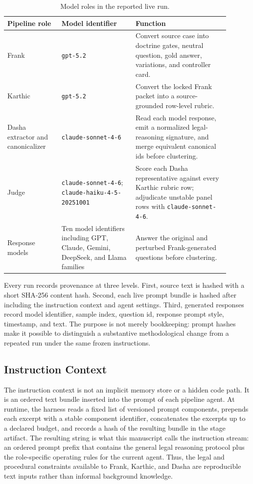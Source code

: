 \begin{table}[h]
\centering
\caption{Model roles in the reported live run.}
\label{tab:model-roles}
\begin{tabular}{p{0.22\linewidth}p{0.30\linewidth}p{0.38\linewidth}}
\toprule
Pipeline role & Model identifier & Function \\
\midrule
Frank & \texttt{gpt-5.2} & Convert source case into doctrine gates, neutral question, gold answer, variations, and controller card. \\
Karthic & \texttt{gpt-5.2} & Convert the locked Frank packet into a source-grounded row-level rubric. \\
Dasha extractor and canonicalizer & \texttt{claude-sonnet-4-6} & Read each model response, emit a normalized legal-reasoning signature, and merge equivalent canonical ids before clustering. \\
Judge & \texttt{claude-sonnet-4-6}; \texttt{claude-haiku-4-5-20251001} & Score each Dasha representative against every Karthic rubric row; adjudicate unstable panel rows with \texttt{claude-sonnet-4-6}. \\
Response models & Ten model identifiers including GPT, Claude, Gemini, DeepSeek, and Llama families & Answer the original and perturbed Frank-generated questions before clustering. \\
\bottomrule
\end{tabular}
\end{table}

Every run records provenance at three levels. First, source text is hashed with a
short SHA-256 content hash. Second, each live prompt bundle is hashed after
including the instruction context and agent settings. Third, generated responses
record model identifier, sample index, question id, response prompt style,
timestamp, and text. The purpose is not merely bookkeeping: prompt hashes make it
possible to distinguish a substantive methodological change from a repeated run
under the same frozen instructions.

\subsection{Instruction Context}

The instruction context is not an implicit memory store or a hidden code path.
It is an ordered text bundle inserted into the prompt of each pipeline agent.
At runtime, the harness reads a fixed list of versioned prompt components,
prepends each excerpt with a stable component identifier, concatenates the
excerpts up to a declared budget, and records a hash of the resulting bundle in
the stage artifact. The resulting string is what this manuscript calls the
instruction stream: an ordered prompt prefix that contains the general legal
reasoning protocol plus the role-specific operating rules for the current agent.
Thus, the legal and procedural constraints available to Frank, Karthic, and
Dasha are reproducible text inputs rather than informal background knowledge.

